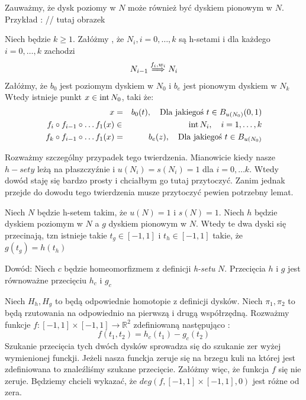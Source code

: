 Zauważmy, że dysk poziomy w $N$ może również być dyskiem pionowym w $N$. Przykład :
// tutaj obrazek

\begin{theorem}
	Niech będzie $k \geq 1 $. Załóżmy , że $N_i, i = 0, \dots ,k $ są h-setami
	i dla każdego $ i = 0, \dots ,k $ zachodzi 
	\begin{eqnarray*}
  		N_{i-1} \stackrel{f_i,w_i}{\Longrightarrow} N_i
	\end{eqnarray*}
	Załóżmy, że $b_0$ jest poziomym dyskiem w $N_0$ i $b_e$ jest pionowym dyskiem
	w $ N_k$ 
	Wtedy istnieje punkt $ x \in {\rm int}\, N_0$, taki  że:
	\begin{eqnarray*}
   	x&=&b_0(t), \quad \mbox{Dla jakiegoś } t \in B_{u(N_0)}(0,1) \\
    f_i \circ f_{i-1} \circ \dots f_1(x) &\in &{\rm int}\, N_i, \quad i = 1, \dots , k \\
    f_k \circ f_{i-1} \circ \dots f_1(x) &=& b_e(z) ,\quad \mbox{Dla jakiegoś } t \in B_{u(N_0)}
\end{eqnarray*}
\end{theorem}

Rozważmy szczególny przypadek tego twierdzenia. Mianowicie kiedy nasze $h-sety$ leżą na
płaszczyźnie i $u(N_i) = s(N_i) =1 $ dla $ i=0, \dots k $. Wtedy dowód staję się bardzo
prosty i chciałbym go tutaj przytoczyć. Zanim jednak przejde do dowodu tego twierdzenia musze przytoczyć pewien potrzebny lemat.

\begin{lemma}
  Niech $ N $ będzie h-setem takim, że $ u(N) = 1 $ i $ s(N) = 1 $.
  Niech $ h $ będzie dyskiem poziomym w $ N $ a $ g $ dyskiem pionowym w $ N $.
  Wtedy te dwa dyski się przecinają, tzn istnieje takie $ t_g \in [-1,1] $ i $ t_h \in [-1,1] $
  takie, że $ g(t_g) = h(t_h) $
 \end{lemma}
  Dowód:
  \newline
  Niech $ c $ będzie homeomorfizmem z definicji {\em h-setu } $ N $.
  Przecięcia $ h $ i $ g $ jest równoważne przecięciu $ h_c $ i $ g_c $ 
  
  Niech $H_h, H_g $ to będą odpowiednie homotopie z definicji dysków.
  Niech $ \pi_1,\pi_2 $ to będą rzutowania na odpowiednio na pierwszą i drugą współrzędną.	
  Rozważmy funkcje $ f : [-1,1] \times [-1,1] \to \mathbb R^2 $ zdefiniowaną następująco :
  \begin{equation}
    f(t_1,t_2) = h_c(t_1) - g_c(t_2)
  \end{equation}
  Szukanie przecięcia tych dwóch dysków sprowadza się do szukanie zer wyżej wymienionej funckji.
  Jeżeli nasza funckja zeruje się na brzegu kuli na której jest zdefiniowana to znaleźliśmy szukane przecięcie.
  Załóżmy więc, że funkcja $f$ się nie zeruje. Będziemy chcieli wykazać, że $ deg(f,[-1,1]\times [-1,1],0) $ jest różne od zera.
 
